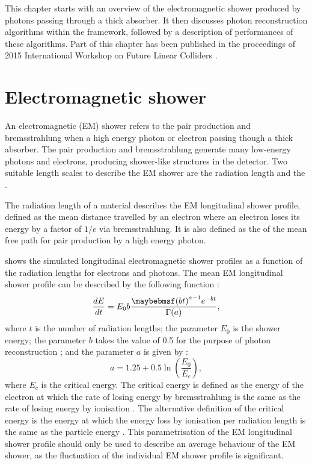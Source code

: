 This chapter starts with an overview of the electromagnetic shower produced by photons passing through a thick absorber. It then discusses photon reconstruction algorithms within the \pandora framework, followed by a description of performances of these algorithms.  Part of this chapter has been published in the proceedings of 2015 International Workshop on Future Linear Colliders \cite{Xu:2016rcz}.




\section{Electromagnetic shower}
\label{sec:photonEMshower}
An electromagnetic (EM) shower refers to the pair production and bremsstrahlung when a high energy photon or electron passing though a thick absorber. The pair production and bremsstrahlung generate many low-energy photons and electrons, producing shower-like  structures in the detector. Two suitable length scales to describe the EM shower are the radiation length and the \RM \cite{PhysRev.149.201,Bathow:1970dn}.

The radiation length of a material describes the EM longitudinal  shower profile, defined as the mean distance travelled by an electron where an electron loses its energy by a factor of $1/e$ via bremsstrahlung. It is also defined as the  of the mean free path  for pair production by a high energy photon\cite{segre1977nuclei}.


 shows the simulated longitudinal electromagnetic shower profiles as a function of the radiation lengths for electrons and photons. The mean EM longitudinal shower profile can be described by the following function \cite{Longo:1975wb} :
\begin{equation}
\frac{dE}{dt} = E_0 b \frac{\parenths{bt}^{a-1}e^{-bt}}{\Gamma(a)},
\label{eq:photonEMshower}
\end{equation}
where $t$ is the number of radiation lengths; the parameter $E_0$ is the shower energy; the parameter $b$ takes the value of 0.5 for the purpose of photon reconstruction \cite{Agashe:2014kda}; and the parameter $a$ is given by \cite{Thomson:2009rp}:
\begin{equation}
a = 1.25 + 0.5\ln\left(\frac{E_0}{E_c}\right),
\end{equation}
where $E_c$ is the critical energy. The critical energy is defined as the energy of the electron at which the rate of losing energy by bremsstrahlung is the same as the rate of losing energy by ionisation \cite{1964NASSP3012.....B}. The alternative definition of the critical energy is the energy at which the energy loss by ionisation per radiation length is the same as the particle energy \cite{rossi1952high}. This parametrisation of the EM longitudinal shower profile should only be used to describe an average behaviour of the EM shower, as the fluctuation of the individual EM shower profile is significant.

